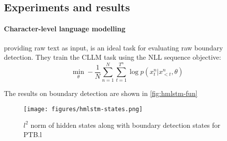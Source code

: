 \subsection{Experiments and results}

\paragraph{Character-level language modelling} providing raw text as input, is an ideal task for evaluating raw boundary detection. 
They train the CLLM task using the NLL sequence objective: 
\begin{equation}
    \min_\theta - \frac{1}{N}\sum^N_{n=1}\sum_{t=1}^{T^n} \log p(x^n_t | x^n_{<t}, \theta)
    \label{eq:hmlstm-nll}
\end{equation}

The results on boundary detection are shown in \cref{fig:hmlstm-fun}


\begin{figure}
    \begin{small}
        \begin{center}
            \texttt{[image: figures/hmlstm-states.png]}
        \end{center}
        \caption{$l^2$ norm of hidden states along with boundary detection states for PTB.l}
        \label{fig:hmlstm-states}
    \end{small}
\end{figure}



